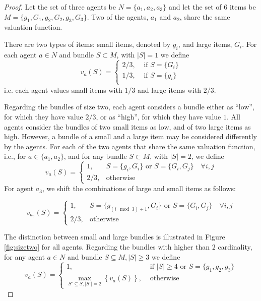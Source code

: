 \begin{proof}
    Let the set of three agents be $N=\{a_1,a_2,a_3\}$ and let the set of $6$ items be $M = \{g_1, G_1, g_2, G_2, g_3, G_3\}$. Two of the agents, $a_1$ and $a_2$, share the same valuation function.
    
    There are two types of items: small items, denoted by $g_i$, and large items, $G_i$. For each agent $a\in N$ and bundle $S\subset M$, with $\lvert S \rvert = 1$ we define 
    $$v_a(S) =   \begin{cases}
    2/3, &\mbox{ if } S=\{G_i\} \\
      1/3, & \mbox{ if } S=\{g_i\} \\
      \end{cases}$$
   i.e. each agent values small items with $1/3$ and large items with $2/3$. 
   
   
   
     Regarding the bundles of size two, each agent considers a bundle either as ``low'', for which they have value $2/3$, or as ``high'', for which they have value $1$. All agents consider the bundles of two small items as low, and of two large items as high. However, a bundle of a small and a large item may be considered differently by the agents. For each of the two agents that share the same valuation function, i.e., for $a \in \{a_1,a_2\}$, and for any bundle $S\subset M$, with $\lvert S \rvert = 2$, we define $$v_a(S) =   \begin{cases}
      1, & S=\{g_i,G_i\} \text{ or } S=\{G_i,G_j\} \quad \forall i,j \\
      2/3, & \text{otherwise} 
    \end{cases}$$
    For agent $a_3$, we shift the combinations of large and small items as follows: 
    
    $$  v_{a_3}(S) =   \begin{cases}
      1, & S=\{g_{(i\mod 3) +1},G_{i }\}  \text{ or } S=\{G_i,G_j\}\quad \forall i,j\\ 
      2/3, & \text{otherwise}
    \end{cases}$$
    
    The distinction between small and large bundles is illustrated in Figure \ref{fig:sizetwo} for all agents. Regarding the bundles with higher than $2$ cardinality, for any agent $a \in N$ and bundle $S\subseteq M,\lvert S\rvert \ge 3$ we define 
    $$v_a(S) =   \begin{cases}
    1, &\mbox{ if } |S|\geq 4 \mbox{ or } S=\{g_1,g_2,g_3\} \\
      \max_{S' \subseteq S,\lvert S' \rvert = 2}\left\{v_a\left(S\right)\right\}, & \mbox{ otherwise } 
      \end{cases}$$
    

\end{proof}
